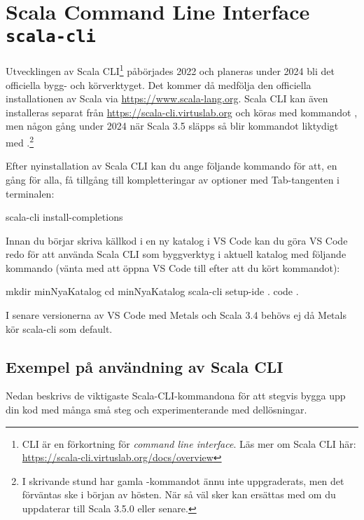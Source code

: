 \section{Scala Command Line Interface \texttt{scala-cli}}\label{appendix:build:scala-cli}

Utvecklingen av Scala CLI\footnote{CLI är en förkortning för \textit{command line interface}. Läs mer om Scala CLI här: \url{https://scala-cli.virtuslab.org/docs/overview}} påbörjades 2022 och planeras under 2024 bli det officiella bygg- och körverktyget. Det kommer då medfölja den officiella installationen av Scala via \url{https://www.scala-lang.org}. Scala CLI kan även installeras separat från \url{https://scala-cli.virtuslab.org} och köras med kommandot , men någon gång under 2024 när Scala 3.5 släpps så blir kommandot  liktydigt med .\footnote{I skrivande stund har gamla -kommandot ännu inte uppgraderats, men det förväntas ske i början av hösten. När så väl sker kan  ersättas med  om du uppdaterar till Scala 3.5.0 eller senare.}

Efter nyinstallation av Scala CLI kan du ange följande kommando för att, en gång för alla, få tillgång till kompletteringar av optioner med Tab-tangenten i terminalen:
\begin{REPLsmall}
scala-cli install-completions 
\end{REPLsmall}

Innan du börjar skriva källkod i en ny katalog i VS Code kan du göra VS Code redo för att använda Scala CLI som byggverktyg i aktuell katalog med följande kommando (vänta med att öppna VS Code till efter att du kört kommandot): 
\begin{REPLsmall}
mkdir minNyaKatalog
cd minNyaKatalog
scala-cli setup-ide . 
code .
\end{REPLsmall}
I senare versionerna av VS Code med Metals och Scala 3.4 behövs ej  då Metals kör scala-cli som default.

\subsection{Exempel på användning av Scala CLI}\label{appendix:build-scala-cli-watch-mode}

Nedan beskrivs de viktigaste Scala-CLI-kommandona för att stegvis bygga upp din kod med många små steg och experimenterande med dellösningar. 

